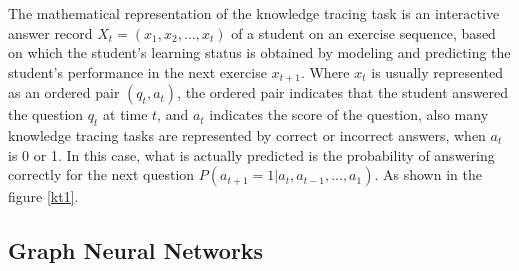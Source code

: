 The mathematical representation of the knowledge tracing task is an interactive answer record \(X_t=(x_1,x_2,\ldots,x_t)\) of a student on an exercise sequence, based on which the student's learning status is obtained by modeling and predicting the student's performance in the next exercise \(x_{t+1}\). Where \(x_t\) is usually represented as an ordered pair \((q_t,a_t)\), the ordered pair indicates that the student answered the question \(q_t\) at time \(t\), and \(a_t\) indicates the score of the question, also many knowledge tracing tasks are represented by correct or incorrect answers, when \(a_t\) is 0 or 1. In this case, what is actually predicted is the probability of answering correctly for the next question \(P(a_{t+1}=1|a_t,a_{t-1},\ldots,a_1)\). As shown in the figure \figurename{\ref{kt1}}.

\subsection{Graph Neural Networks}



